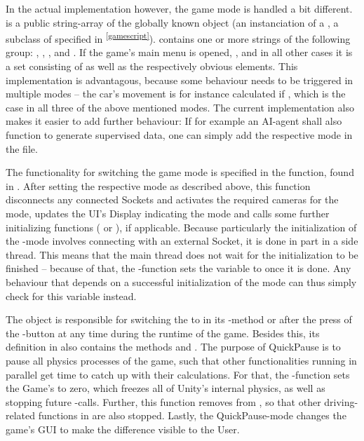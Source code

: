In the actual implementation however, the game mode is handled a bit different.  is a public string-array of the globally known object  (an instanciation of a , a subclass of  specified in \textsuperscript{\ref{gamescript}}).  contains one or more strings of the following group: , , ,  and . If the game's main menu is opened, , and in all other cases it is a set consisting of  as well as the respectively obvious elements. This implementation is advantagous, because some behaviour needs to be triggered in multiple modes -- the car's movement is for instance calculated if , which is the case in all three of the above mentioned modes. The current implementation also makes it easier to add further behaviour: If for example an AI-agent shall also function to generate supervised data, one can simply add the respective mode in the  file.

The functionality for switching the game mode is specified in the  function, found in . After setting the respective mode as described above, this function disconnects any connected Sockets and  activates the required cameras for the mode, updates the UI's Display indicating the mode and calls some further initializing functions ( or ), if applicable. Because particularly the initialization of the -mode involves connecting with an external Socket, it is done in part in a side thread. This means that the main thread does not wait for the initialization to be finished -- because of that, the -function sets the variable  to  once it is done. Any behaviour that depends on a successful initialization of the mode can thus simply check for this variable instead.

The object  is responsible for switching the  to  in its -method or after the press of the -button at any time during the runtime of the game. Besides this, its definition in  also contains the methods  and . The purpose of QuickPause is to pause all physics processes of the game, such that other functionalities running in parallel get time to catch up with their calculations. For that, the -function sets the Game's  to zero, which freezes all of Unity's internal physics, as well as stopping future -calls. Further, this function removes  from , so that other driving-related functions in  are also stopped. Lastly, the QuickPause-mode changes the game's GUI to make the difference visible to the User. 

